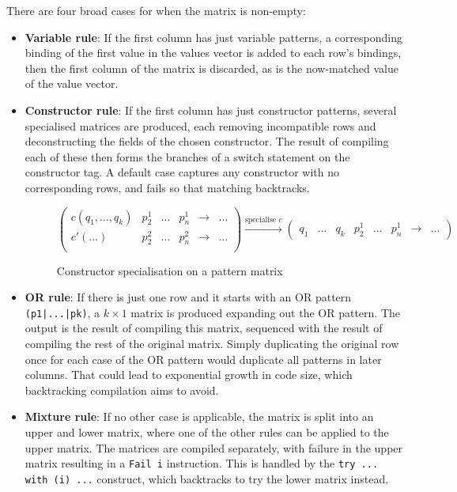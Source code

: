 There are four broad cases for when the matrix is non-empty:
\begin{itemize}
\item \textbf{Variable rule}: If the first column has just variable patterns, a corresponding binding of the first value in the values vector is added to each row's bindings, then the first column of the matrix is discarded, as is the now-matched value of the value vector.
\item \textbf{Constructor rule}: If the first column has just constructor patterns, several specialised matrices are produced, each removing incompatible rows and deconstructing the fields of the chosen constructor. The result of compiling each of these then forms the branches of a switch statement on the constructor tag. A default case captures any constructor with no corresponding rows, and fails so that matching backtracks. 
\begin{figure}[H]
\hfill
$
\begin{pmatrix}
c(q_1, \dots, q_k) & p^1_2 & \dots & p^1_n & \to & \dots \\
c'(\dots) & p^2_2 & \dots & p^2_n & \to & \dots \\
\end{pmatrix}
\xrightarrow{\text{specialise } c}
\begin{pmatrix}
 q_1 & \dots & q_k & p^1_2 & \dots & p^1_n  & \to & \dots 
\end{pmatrix}
$ \hfill
\caption{Constructor specialisation on a pattern matrix}
\end{figure}
\item \textbf{OR rule}: If there is just one row and it starts with an OR pattern \verb"(p1|...|pk)", a $k \times 1$ matrix is produced expanding out the OR pattern. %
The output is the result of compiling this matrix, sequenced with the result of compiling the rest of the original matrix. Simply duplicating the original row once for each case of the OR pattern would duplicate all patterns in later columns. That could lead to exponential growth in code size, which backtracking compilation aims to avoid.
\item \textbf{Mixture rule}: If no other case is applicable, the matrix is split into an upper and lower matrix, where one of the other rules can be applied to the upper matrix. The matrices are compiled separately, with failure in the upper matrix resulting in a \verb|Fail i| instruction. This is handled by the \verb|try ... with (i) ...| construct, which backtracks to try the lower matrix instead.

\end{itemize}

